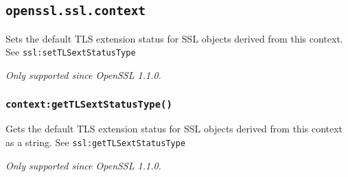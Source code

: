 \documentclass[11pt, oneside]{memoir}
\newcommand*{\fn}[1]{\texttt{#1}\xspace}
\newcounter{toccols}
\newenvironment{Module}[1]{
	\subsection{\texttt{#1}}
	\addtocontents{toc}{
		\protect\begin{multicols}{\value{toccols}}
	}
}{
	\addtocontents{toc}{\protect\end{multicols}}
}
\begin{document}
\begin{Module}{openssl.ssl.context}
Sets the default TLS extension status for SSL objects derived from this context.
See \fn{ssl:setTLSextStatusType}

\emph{Only supported since OpenSSL 1.1.0.}

\subsubsection[\fn{context:getTLSextStatusType}]{\fn{context:getTLSextStatusType()}}

Gets the default TLS extension status for SSL objects derived from this context as a string.
See \fn{ssl:getTLSextStatusType}

\emph{Only supported since OpenSSL 1.1.0.}

\end{Module}
\end{document}
